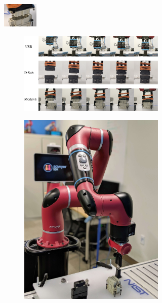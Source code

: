 \begin{figure}[t]
\begin{subfigure}{0.14\linewidth}
        \includegraphics[height=1.17cm]{insertion/newfigs/modele.png} \vspace{0.05cm}
    \end{subfigure}
    \begin{subfigure}{0.69\linewidth}
        \begin{subfigure}[b]{0.69\linewidth}
            \includegraphics[trim={1.7cm 0 0 0},clip,width=0.99\linewidth]{insertion/newfigs/fig_usb.png} 
            \centering
        \end{subfigure}\hspace{2pt}
        \begin{subfigure}[b]{0.29\linewidth}
            \includegraphics[trim={0 0 9cm 0},clip,width=0.99\linewidth]{insertion/figs/robot_view2.jpg}

\end{subfigure}
\end{subfigure}
\end{figure}
